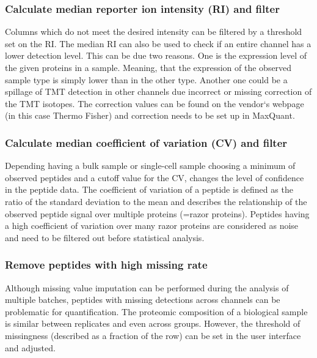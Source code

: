 \documentclass[
  11pt,
]{article}
\begin{document}
\hypertarget{calculate-median-reporter-ion-intensity-ri-and-filter}{%
\subsubsection{Calculate median reporter ion intensity (RI) and filter}\label{calculate-median-reporter-ion-intensity-ri-and-filter}}

Columns which do not meet the desired intensity can be filtered by a threshold set on the RI. The median RI can also be used to check if an entire channel has a lower detection level. This can be due two reasons. One is the expression level of the given proteins in a sample. Meaning, that the expression of the observed sample type is simply lower than in the other type. Another one could be a spillage of TMT detection in other channels due incorrect or missing correction of the TMT isotopes. The correction values can be found on the vendor`s webpage (in this case Thermo Fisher) and correction needs to be set up in MaxQuant.

\hypertarget{calculate-median-coefficient-of-variation-cv-and-filter}{%
\subsubsection{Calculate median coefficient of variation (CV) and filter}\label{calculate-median-coefficient-of-variation-cv-and-filter}}

Depending having a bulk sample or single-cell sample choosing a minimum of observed peptides and a cutoff value for the CV, changes the level of confidence in the peptide data. The coefficient of variation of a peptide is defined as the ratio of the standard deviation to the mean and describes the relationship of the observed peptide signal over multiple proteins (=razor proteins). Peptides having a high coefficient of variation over many razor proteins are considered as noise and need to be filtered out before statistical analysis.

\hypertarget{remove-peptides-with-high-missing-rate}{%
\subsubsection{Remove peptides with high missing rate}\label{remove-peptides-with-high-missing-rate}}

Although missing value imputation can be performed during the analysis of multiple batches, peptides with missing detections across channels can be problematic for quantification. The proteomic composition of a biological sample is similar between replicates and even across groups. However, the threshold of missingness (described as a fraction of the row) can be set in the user interface and adjusted.
\end{document}
